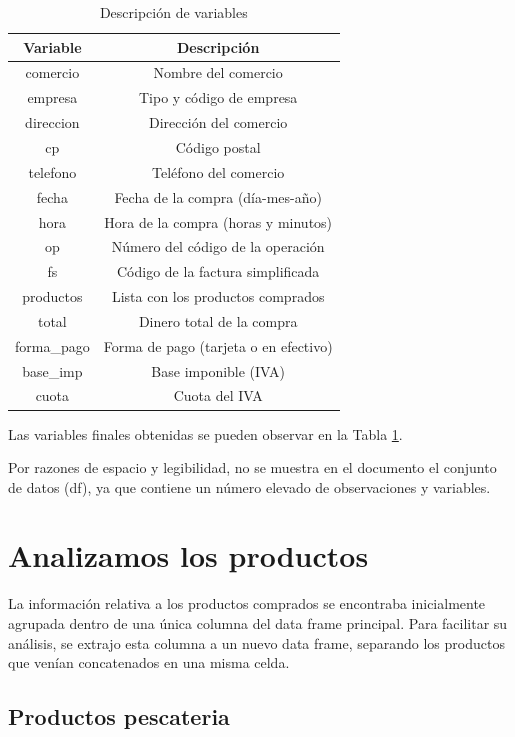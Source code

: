 \documentclass[,article,submit,moreauthors,pdftex]{Definitions/mdpi}
\begin{document}
\begin{table}

\caption{\label{tab:tabla_variables}Descripción de variables}
\centering
\begin{tabular}[t]{cc}
\toprule
Variable & Descripción\\
\midrule
comercio & Nombre del comercio\\
empresa & Tipo y código de empresa\\
direccion & Dirección del comercio\\
cp & Código postal\\
telefono & Teléfono del comercio\\
\addlinespace
fecha & Fecha de la compra (día-mes-año)\\
hora & Hora de la compra (horas y minutos)\\
op & Número del código de la operación\\
fs & Código de la factura simplificada\\
productos & Lista con los productos comprados\\
\addlinespace
total & Dinero total de la compra\\
forma\_pago & Forma de pago (tarjeta o en efectivo)\\
base\_imp & Base imponible (IVA)\\
cuota & Cuota del IVA\\
\bottomrule
\end{tabular}
\end{table}

Las variables finales obtenidas se pueden observar en la Tabla
\ref{tab:tabla_variables}.

Por razones de espacio y legibilidad, no se muestra en el documento el
conjunto de datos (df), ya que contiene un número elevado de
observaciones y variables.

\hypertarget{analizamos-los-productos}{%
\section{Analizamos los productos}\label{analizamos-los-productos}}

La información relativa a los productos comprados se encontraba
inicialmente agrupada dentro de una única columna del data frame
principal. Para facilitar su análisis, se extrajo esta columna a un
nuevo data frame, separando los productos que venían concatenados en una
misma celda.

\hypertarget{productos-pescateria}{%
\subsection{Productos pescateria}\label{productos-pescateria}}
\end{document}
